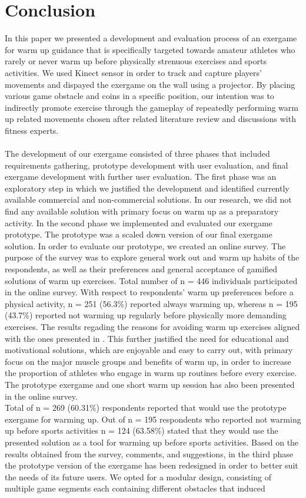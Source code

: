 \chapter{Conclusion}
\label{chap:conclusion}
In this paper we presented a development and evaluation process of an exergame for warm up guidance that is specifically targeted towards amateur athletes who rarely or never warm up before physically strenuous exercises and sports activities. We used Kinect sensor in order to track and capture players' movements and dispayed the exergame on the wall using a projector. By placing various game obstacle and coins in a specific position, our intention was to indirectly promote exercise through the gameplay of repeatedly performing warm up related movements chosen after related literature review and discussions with fitness experts.\\\\The development of our exergame consisted of three phases that included requirements gathering, prototype development with user evaluation, and final exergame development with further user evaluation. The first phase was an exploratory step in which we justified the development and identified currently available commercial and non-commercial solutions. In our research, we did not find any available solution with primary focus on warm up as a preparatory activity. In the second phase we implemented and evaluated our exergame prototype. The prototype was a scaled down version of our final exergame solution.  In order to evaluate our prototype, we created an online survey. The purpose of the survey was to explore general work out and warm up habits of the respondents, as well as their preferences and general acceptance of gamified solutions of warm up exercises.  Total number of n = 446 individuals participated in the online survey. With respect to respondents' warm up preferences before a physical activity, n = 251 (56.3\%) reported always warming up, whereas n = 195 (43.7\%) reported not warming up regularly before physically more demanding exercises. The results regading the reasons for avoiding warm up exercises aligned with the ones presented in \cite{fradkin2010effects}. This further justified the need for educational and motivational solutions, which are enjoyable and easy to carry out, with primary focus on the major muscle groups and benefits of warm up, in order to increase the proportion of athletes who engage in warm up routines before every exercise. The prototype exergame and one short warm up session has also been presented in the online survey. \\Total of n = 269 (60.31\%) respondents reported that would use the prototype exergame for warming up. Out of n = 195 respondents who reported not warming up before sports activities n = 124 (63.58\%) stated that they would use the presented solution as a tool for warming up before sports activities. Based on the results obtained from the survey, comments, and suggestions, in the third phase the prototype version of the exergame has been redesigned in order to better suit the needs of its future users. We opted for a modular design, consisting of multiple game segments each containing different obstacles that induced 